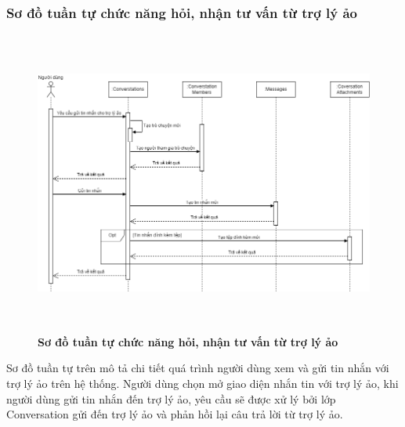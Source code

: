 \subsubsection{Sơ đồ tuần tự chức năng hỏi, nhận tư vấn từ trợ lý ảo}
\begin{figure}[H]
  \centering
  \includegraphics[width=14.5cm,height=10cm]{Images/sequence/sequence_chat_ai.png}
  \caption[Sơ đồ tuần tự chức năng hỏi, nhận tư vấn từ trợ lý ảo]{\bfseries \fontsize{12pt}{0pt}
  \selectfont Sơ đồ tuần tự chức năng hỏi, nhận tư vấn từ trợ lý ảo}
  \label{sequence_chat_ai} %
\end{figure}
Sơ đồ tuần tự trên mô tả chi tiết quá trình người dùng xem và gửi tin nhắn với trợ lý ảo trên hệ thống. Người dùng chọn mở giao diện nhắn tin với trợ lý ảo, 
khi người dùng gửi tin nhắn đến trợ lý ảo, yêu cầu sẽ được xử lý bởi lớp Conversation gửi đến trợ lý ảo và phản hồi lại câu trả lời từ trợ lý ảo.


